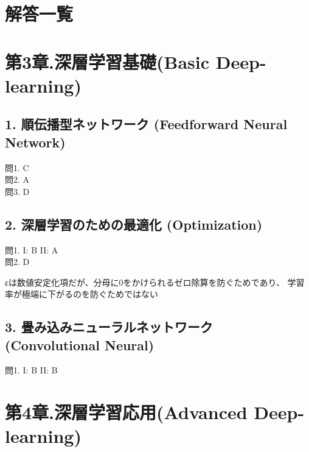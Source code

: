 \documentclass[
  letterpaper,
  DIV=11,
  numbers=noendperiod]{scrreprt}
\newenvironment{Shaded}{\begin{snugshade}}{\end{snugshade}}
\newcommand{\NormalTok}[1]{\textcolor[rgb]{0.00,0.23,0.31}{#1}}
\begin{document}

\chapter{解答一覧}\label{ux89e3ux7b54ux4e00ux89a7}


\chapter{第3章.深層学習基礎(Basic
Deep-learning)}\label{ux7b2c3ux7ae0.ux6df1ux5c64ux5b66ux7fd2ux57faux790ebasic-deep-learning}

\section{1. 順伝播型ネットワーク (Feedforward Neural
Network)}\label{ux9806ux4f1dux64adux578bux30cdux30c3ux30c8ux30efux30fcux30af-feedforward-neural-network-1}

問1. C\\
問2. A\\
問3. D

\section{2. 深層学習のための最適化
(Optimization)}\label{ux6df1ux5c64ux5b66ux7fd2ux306eux305fux3081ux306eux6700ux9069ux5316-optimization-1}

問1. I: B II: A\\
問2. D

\begin{Shaded}
\begin{Highlighting}[]
\NormalTok{εは数値安定化項だが、分母に0をかけられるゼロ除算を防ぐためであり、}
\NormalTok{学習率が極端に下がるのを防ぐためではない}
\end{Highlighting}
\end{Shaded}

\section{3. 畳み込みニューラルネットワーク (Convolutional
Neural)}\label{ux7573ux307fux8fbcux307fux30cbux30e5ux30fcux30e9ux30ebux30cdux30c3ux30c8ux30efux30fcux30af-convolutional-neural-1}

問1. I: B II: B


\chapter{第4章.深層学習応用(Advanced
Deep-learning)}\label{ux7b2c4ux7ae0.ux6df1ux5c64ux5b66ux7fd2ux5fdcux7528advanced-deep-learning-1}
\end{document}
